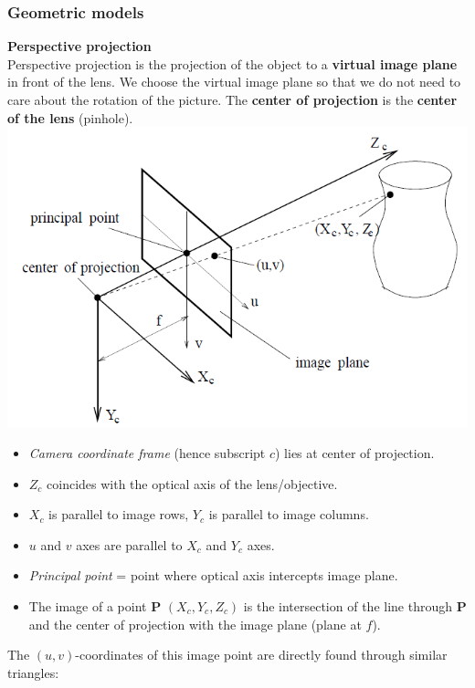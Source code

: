 \documentclass[a4paper, fontsize=8pt, landscape, DIV=1]{scrartcl}
\begin{document}
\begin{multicols*}{4}
		\subsubsection{Geometric models}
		\textbf{Perspective projection}\\
		Perspective projection is the projection of the object to a \textbf{virtual image plane} in front of the lens. We choose the virtual image plane so that we do not need to care about the rotation of the picture. The \textbf{center of projection} is the \textbf{center of the lens} (pinhole).\\
		\includegraphics[width=\columnwidth]{images/ImageAcq/perspective_projection.png}\\
		\begin{itemize}[noitemsep]
			\item \textit{Camera coordinate frame} (hence subscript $c$) lies at center of projection.
			\item $Z_c$ coincides with the optical axis of the lens/objective.
			\item $X_c$ is parallel to image rows, $Y_c$ is parallel to image columns.
			\item $u$ and $v$ axes are parallel to $X_c$ and $Y_c$ axes. 
			\item \textit{Principal point} = point where optical axis intercepts image plane.
			\item The image of a point \textbf{P} $(X_c,Y_c,Z_c)$ is the intersection of the line through \textbf{P} and the center of projection with the image plane (plane at $f$).
		\end{itemize}
		The $(u,v)$-coordinates of this image point are directly found through similar triangles:\\

\end{multicols*}
\end{document}
